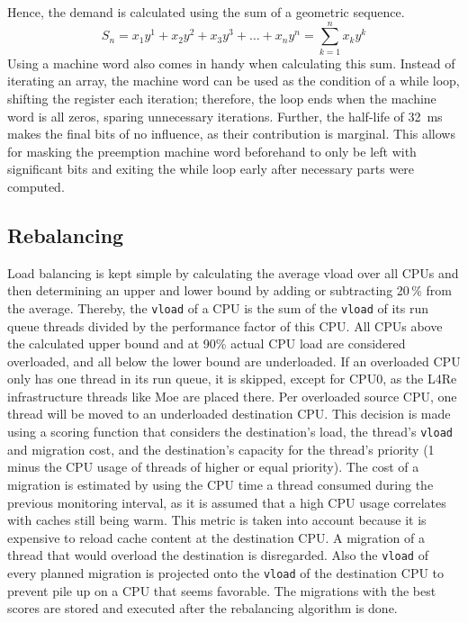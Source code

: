 Hence, the demand is calculated using the sum of a geometric sequence.
\[
S_n = x_1 y^1 + x_2 y^2 + x_3 y^3 + \dots + x_n y^n = \sum_{k=1}^{n} x_k y^k
\]
Using a machine word also comes in handy when calculating this sum.
Instead of iterating an array, the machine word can be used as the condition of a while loop, shifting the register each iteration; therefore, the loop ends when the machine word is all zeros, sparing unnecessary iterations.
Further, the half-life of \SI{32}{\ms} makes the final bits of no influence, as their contribution is marginal.
This allows for masking the preemption machine word beforehand to only be left with significant bits and exiting the while loop early after necessary parts were computed.

\subsection{Rebalancing}
\label{sec:rebalancing}

Load balancing is kept simple by calculating the average vload over all CPUs and then determining an upper and lower bound by adding or subtracting 20\,\% from the average.
Thereby, the \texttt{vload} of a CPU is the sum of the \texttt{vload} of its run queue threads divided by the performance factor of this CPU.
All CPUs above the calculated upper bound and at 90\% actual CPU load are considered overloaded, and all below the lower bound are underloaded.
If an overloaded CPU only has one thread in its run queue, it is skipped, except for CPU0, as the L4Re infrastructure threads like Moe are placed there.
Per overloaded source CPU, one thread will be moved to an underloaded destination CPU.
This decision is made using a scoring function that considers the destination's load, the thread's \texttt{vload} and migration cost, and the destination's capacity for the thread's priority (1 minus the CPU usage of threads of higher or equal priority).
The cost of a migration is estimated by using the CPU time a thread consumed during the previous monitoring interval, as it is assumed that a high CPU usage correlates with caches still being warm. 
This metric is taken into account because it is expensive to reload cache content at the destination CPU.
A migration of a thread that would overload the destination is disregarded.
Also the \texttt{vload} of every planned migration is projected onto the \texttt{vload} of the destination CPU to prevent pile up on a CPU that seems favorable.
The migrations with the best scores are stored and executed after the rebalancing algorithm is done.

